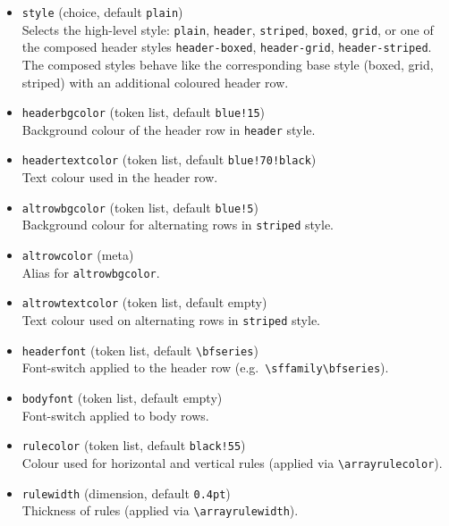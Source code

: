 \documentclass[11pt,a4paper]{article}
\begin{document}
\begin{itemize}
  \item \texttt{style} (choice, default \texttt{plain})\\
    Selects the high-level style:
    \texttt{plain}, \texttt{header}, \texttt{striped},
    \texttt{boxed}, \texttt{grid}, or one of the composed
    header styles \texttt{header-boxed}, \texttt{header-grid},
    \texttt{header-striped}.  The composed styles behave like
    the corresponding base style (boxed, grid, striped) with
    an additional coloured header row.

  \item \texttt{headerbgcolor} (token list, default \texttt{blue!15})\\
    Background colour of the header row in \texttt{header} style.

  \item \texttt{headertextcolor} (token list, default \texttt{blue!70!black})\\
    Text colour used in the header row.

  \item \texttt{altrowbgcolor} (token list, default \texttt{blue!5})\\
    Background colour for alternating rows in \texttt{striped} style.

  \item \texttt{altrowcolor} (meta)\\
    Alias for \texttt{altrowbgcolor}.

  \item \texttt{altrowtextcolor} (token list, default empty)\\
    Text colour used on alternating rows in \texttt{striped} style.

  \item \texttt{headerfont} (token list, default \verb|\bfseries|)\\
    Font-switch applied to the header row (e.g.\ \verb|\sffamily\bfseries|).

  \item \texttt{bodyfont} (token list, default empty)\\
    Font-switch applied to body rows.

  \item \texttt{rulecolor} (token list, default \texttt{black!55})\\
    Colour used for horizontal and vertical rules
    (applied via \verb|\arrayrulecolor|).

  \item \texttt{rulewidth} (dimension, default \texttt{0.4pt})\\
    Thickness of rules (applied via \verb|\arrayrulewidth|).
\end{itemize}
\end{document}

